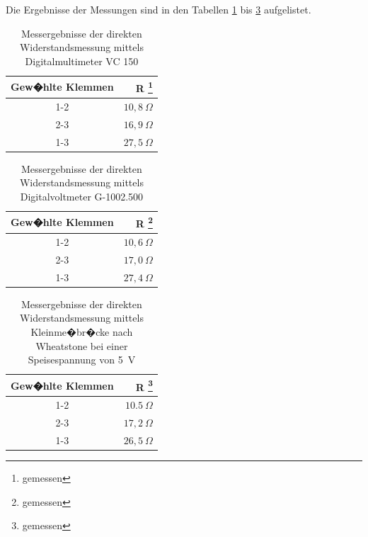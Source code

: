 \documentclass[10pt]{scrartcl}
\begin{document}
Die Ergebnisse der Messungen sind in den Tabellen \ref{table:3} bis \ref{table:5} aufgelistet.

\begin{table}
\begin{minipage}[t]{\textwidth}
\begin{center}
\begin{tabular}{|cr|}
\hline
    Gew�hlte Klemmen & R \footnote{\label{fn:gemessen}gemessen}\\
\hline
    1-2 & $10,8~\Omega$\\
    2-3 & $16,9~\Omega$\\
    1-3 & $27,5~\Omega$\\
\hline
\end{tabular}
\end{center}
\end{minipage}
\caption{Messergebnisse der direkten Widerstandsmessung mittels Digitalmultimeter VC 150}
\label{table:3}
\end{table}

\begin{table}
\begin{minipage}[t]{\textwidth}
\begin{center}
\begin{tabular}{|cr|}
\hline
    Gew�hlte Klemmen & R \footnote{\label{fn:gemessen}gemessen}\\
\hline
    1-2 & $10,6~\Omega$\\
    2-3 & $17,0~\Omega$\\
    1-3 & $27,4~\Omega$\\
\hline
\end{tabular}
\end{center}
\end{minipage}
\caption{Messergebnisse der direkten Widerstandsmessung mittels Digitalvoltmeter G-1002.500}
\label{table:4}
\end{table}

\begin{table}
\begin{minipage}[t]{\textwidth}
\begin{center}
\begin{tabular}{|cr|}
\hline
    Gew�hlte Klemmen & R \footnote{\label{fn:gemessen}gemessen}\\
\hline
    1-2 & $10.5~\Omega$\\
    2-3 & $17,2~\Omega$\\
    1-3 & $26,5~\Omega$\\
\hline
\end{tabular}
\end{center}
\end{minipage}
\caption{Messergebnisse der direkten Widerstandsmessung mittels Kleinme�br�cke nach Wheatstone bei einer Speisespannung von 5~V}
\label{table:5}
\end{table}
\end{document}
